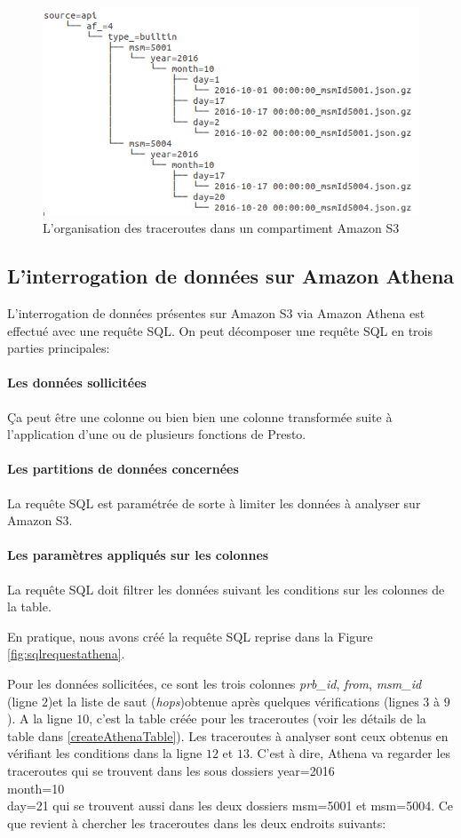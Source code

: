 \begin{figure}
	\centering
	\includegraphics[width=1\linewidth]{illustrations/partitionnement-athena}
	\caption{L'organisation des traceroutes dans un compartiment Amazon S3}
	\label{fig:partitionnement-athena}
\end{figure}
 

\subsection{L'interrogation de données sur Amazon Athena}

L'interrogation de données présentes sur Amazon S3 via Amazon Athena est effectué avec une requête SQL. On peut décomposer une requête SQL en trois parties principales:
\paragraph{Les données sollicitées} Ça peut être une colonne ou bien bien une colonne transformée suite à l'application d'une ou de plusieurs fonctions de Presto.
\paragraph{Les partitions de données concernées} La requête SQL est paramétrée de sorte à limiter les données à analyser sur Amazon S3. 
\paragraph{Les paramètres appliqués sur les colonnes} La requête SQL doit filtrer les données suivant les conditions sur les colonnes de la table.

En pratique, nous avons créé la requête SQL reprise dans la Figure \ref{fig:sqlrequestathena}. 


Pour les données sollicitées, ce sont les trois colonnes \textit{prb\_id}, \textit{from}, \textit{msm\_id} (ligne $2$)et la liste de saut (\textit{hops})obtenue après quelques vérifications (lignes $3$ à $9$). A la ligne $10$, c'est la table créée pour les traceroutes (voir les détails de la table dans \ref{createAthenaTable}). Les traceroutes à analyser sont ceux obtenus en vérifiant les conditions dans la ligne  $12$ et $13$. C'est à dire, Athena va regarder les traceroutes qui se trouvent dans les sous dossiers year=2016\\month=10\\day=21 qui se trouvent aussi dans les deux dossiers msm=5001 et msm=5004. Ce que revient à chercher les traceroutes dans les deux endroits suivants:

